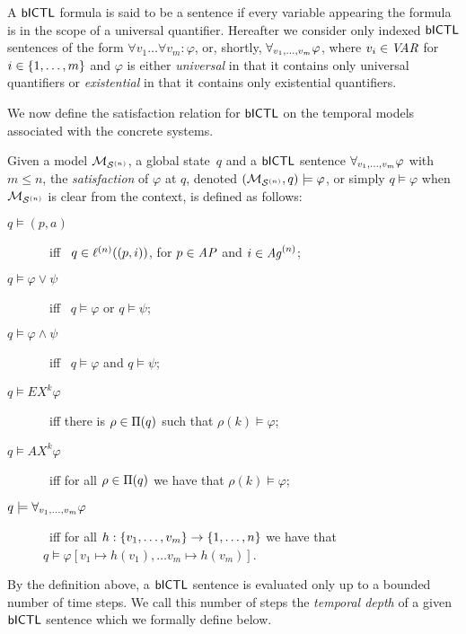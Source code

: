 A $\sf{bICTL}$ formula is said to be a sentence if every variable appearing the
formula is in the scope of a universal quantifier. Hereafter we consider only
indexed $\sf{bICTL}$ sentences of the form $\forall v_1 \ldots \forall v_m :
\varphi$, or, shortly, $\forall_{v_1,\ldots,v_m} \varphi$, where $v_i \in \it{VAR}$ for $i \in
\left \{ 1,\ldots,m \right \}$ and $\varphi$ is either {\em universal} in that it contains
only universal quantifiers or {\em existential} in that it contains only
existential quantifiers.


We now define the satisfaction relation for $\sf{bICTL}$ on the temporal models
associated with the concrete systems.

\begin{definition}[Satisfaction]
  \label{def:sat} 
  Given a model $\mathcal{M}_{\mathcal{S}^{(n)}}$, a global state~$q$ and a $\sf{bICTL}$ sentence
  $\forall_{v_1,\ldots,v_m} \varphi$ with $m \leq n$, the \emph{satisfaction} of $\varphi$ at $q$,
  denoted $(\mathcal{M}_{\mathcal{S}^{(n)}}, q) \models\varphi$, or simply $q \models \varphi$ when
  $\mathcal{M}_{\mathcal{S}^{(n)}}$ is clear from the context, is defined as follows:
  \begin{description}
  \item[$q \models (p, a)$] \ iff \ $q \in \ell^{(n)}((p, i))$, for $p \in
  \it{AP}$ and $i \in \mathit{Ag}^{(n)}$; 
  \item[$q \models \varphi \lor \psi$] \ iff \ $q \models \varphi$ or $q \models
  \psi$;
  \item[$q \models \varphi \land \psi$] \ iff \ $q \models \varphi$ and $q
  \models \psi$;
  \item[$q \models EX^k  \varphi$] \ iff  there is $\rho \in \Pi(q)$ such
  that $\rho(k) \models \varphi$;
  \item[$q \models AX^k  \varphi$] \ iff for all $\rho \in \Pi(q)$ we
  have that $\rho(k) \models \varphi$;
  \item[$q \models \forall_{v_1,\ldots,v_m} \varphi$] \ iff for all $h : \left \{ v_1, \ldots, v_m \right \}
  \rightarrow \left \{ {1}, \ldots,{n} \right \}$ we have that $q \models 
  \varphi[v_1 \mapsto h(v_1), \ldots v_m \mapsto h(v_m)]$.
\end{description}
\end{definition}


By the definition above, a $\sf{bICTL}$ sentence is evaluated only up to a bounded
number of time steps.  We call this number of steps the {\em temporal depth} of
a given $\sf{bICTL}$ sentence which we formally define below.

